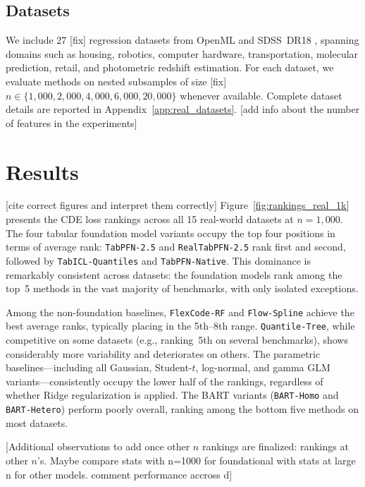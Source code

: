 \documentclass{article}
\newcommand{\method}[1]{\texttt{#1}}
\begin{document}
\subsection{Datasets}
\label{sec:datasets}

We include 27 [fix] regression datasets from OpenML and SDSS~DR18
\citep{sdss_dr18}, spanning domains such as housing, robotics, computer
hardware, transportation, molecular prediction, retail, and photometric
redshift estimation. For each dataset, we evaluate methods on nested subsamples
of size [fix] $n \in \{1{,}000, 2{,}000, 4{,}000, 6{,}000, 20{,}000\}$ whenever
available. Complete dataset details are reported in
Appendix~\ref{app:real_datasets}.
[add info about the number of features in the experiments]


\section{Results}
\label{sec:results}
 
 [cite correct figures and interpret them correctly]
Figure~\ref{fig:rankings_real_1k} presents the CDE loss rankings across
all 15 real-world datasets at $n = 1{,}000$.
The four tabular foundation model variants occupy the top four positions
in terms of average rank: \method{TabPFN-2.5} and \method{RealTabPFN-2.5}
rank first and second, followed by \method{TabICL-Quantiles} and
\method{TabPFN-Native}.
This dominance is remarkably consistent across datasets: the foundation
models rank among the top~5 methods in the vast majority of benchmarks,
with only isolated exceptions.
 
Among the non-foundation baselines, \method{FlexCode-RF} and
\method{Flow-Spline} achieve the best average ranks, typically placing
in the 5th--8th range.
\method{Quantile-Tree}, while competitive on some datasets (e.g.,
ranking~5th on several benchmarks), shows considerably more variability
and deteriorates on others.
The parametric baselines---including all Gaussian, Student-$t$,
log-normal, and gamma GLM variants---consistently occupy the lower
half of the rankings, regardless of whether Ridge regularization is
applied.
The BART variants (\method{BART-Homo} and \method{BART-Hetero}) perform
poorly overall, ranking among the bottom five methods on most datasets.
 
[Additional observations to add once other $n$ rankings are finalized:
rankings at other $n$'s.
Maybe compare stats with n=1000 for foundational with stats at large n for other models. comment performance accross d]
\end{document}
